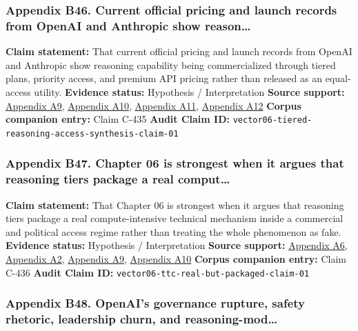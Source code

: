 \documentclass[
  american,
  11pt,
  letterpaper,
]{article}
\begin{document}
\subsubsection{Appendix B46. Current official pricing and launch records
from OpenAI and Anthropic show
reason\ldots{}}\label{appendix-b46-current-official-pricing-and-launch-records-from-openai-and-anthropic-show-reason}

\textbf{Claim statement:} That current official pricing and launch
records from OpenAI and Anthropic show reasoning capability being
commercialized through tiered plans, priority access, and premium API
pricing rather than released as an equal-access utility.
\textbf{Evidence status:} Hypothesis / Interpretation \textbf{Source
support:}
\hyperref[appendix-a9-chatgpt-plans-free-go-plus-pro-business-and-enterprise]{Appendix
A9}, \hyperref[appendix-a10-pricing-openai-api]{Appendix A10},
\hyperref[appendix-a11-plans-pricing-claude-by-anthropic]{Appendix A11},
\hyperref[appendix-a12-introducing-claude-4]{Appendix A12}
\textbf{Corpus companion entry:} Claim C-435 \textbf{Audit Claim ID:}
\texttt{vector06-tiered-reasoning-access-synthesis-claim-01}

\subsubsection{Appendix B47. Chapter 06 is strongest when it argues that
reasoning tiers package a real
comput\ldots{}}\label{appendix-b47-chapter-06-is-strongest-when-it-argues-that-reasoning-tiers-package-a-real-comput}

\textbf{Claim statement:} That Chapter 06 is strongest when it argues
that reasoning tiers package a real compute-intensive technical
mechanism inside a commercial and political access regime rather than
treating the whole phenomenon as fake. \textbf{Evidence status:}
Hypothesis / Interpretation \textbf{Source support:}
\hyperref[appendix-a6-scaling-llm-test-time-compute-optimally-can-be-more-effective-than-scaling-model-parameters]{Appendix
A6}, \hyperref[appendix-a2-openai-o1-system-card]{Appendix A2},
\hyperref[appendix-a9-chatgpt-plans-free-go-plus-pro-business-and-enterprise]{Appendix
A9}, \hyperref[appendix-a10-pricing-openai-api]{Appendix A10}
\textbf{Corpus companion entry:} Claim C-436 \textbf{Audit Claim ID:}
\texttt{vector06-ttc-real-but-packaged-claim-01}

\subsubsection{Appendix B48. OpenAI's governance rupture, safety
rhetoric, leadership churn, and
reasoning-mod\ldots{}}\label{appendix-b48-openai-s-governance-rupture-safety-rhetoric-leadership-churn-and-reasoning-mod}
\end{document}
